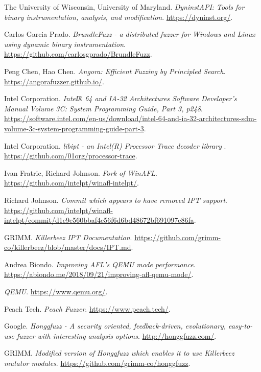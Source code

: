 \begin{thebibliography}{99}
  The University of Wisconsin, University of Maryland.
  \textit{DyninstAPI: Tools for binary instrumentation, analysis, and modification}.
  \url{https://dyninst.org/}.

  Carlos Garcia Prado.
  \textit{BrundleFuzz - a distributed fuzzer for Windows and Linux using dynamic binary instrumentation}.
  \url{https://github.com/carlosgprado/BrundleFuzz}.

  Peng Chen, Hao Chen.
  \textit{Angora: Efficient Fuzzing by Principled Search}.
  \url{https://angorafuzzer.github.io/}.

  Intel Corporation.
  \textit{Intel® 64 and IA-32 Architectures Software Developer's Manual Volume 3C: System Programming Guide, Part 3, p248}.
  \url{https://software.intel.com/en-us/download/intel-64-and-ia-32-architectures-sdm-volume-3c-system-programming-guide-part-3}.

  Intel Corporation.
  \textit{libipt - an Intel(R) Processor Trace decoder library }.
  \url{https://github.com/01org/processor-trace}.

  Ivan Fratric, Richard Johnson.
  \textit{Fork of WinAFL}.
  \url{https://github.com/intelpt/winafl-intelpt/}.

  Richard Johnson.
  \textit{Commit which appears to have removed IPT support}.
  \url{https://github.com/intelpt/winafl-intelpt/commit/d1e9e560bbaf4e56f6d6bd48672bf691097e86fa}.

  GRIMM.
  \textit{Killerbeez IPT Documentation}.
  \url{https://github.com/grimm-co/killerbeez/blob/master/docs/IPT.md}.

  Andrea Biondo.
  \textit{Improving AFL's QEMU mode performance}.
  \url{https://abiondo.me/2018/09/21/improving-afl-qemu-mode/}.

  \textit{QEMU}.
  \url{https://www.qemu.org/}.

  Peach Tech.
  \textit{Peach Fuzzer}.
  \url{https://www.peach.tech/}.

  Google.
  \textit{Honggfuzz - A security oriented, feedback-driven, evolutionary, easy-to-use fuzzer with interesting analysis options}.
  \url{http://honggfuzz.com/}.

  GRIMM.
  \textit{Modified version of Honggfuzz which enables it to use Killerbeez mutator modules}.
  \url{https://github.com/grimm-co/honggfuzz}.


\end{thebibliography}
